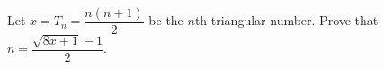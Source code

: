Let $x=T_n=\dfrac{n(n+1)}{2}$ be the $n$th triangular number. Prove that $n=\dfrac{\sqrt{8x+1}-1}{2}$.
